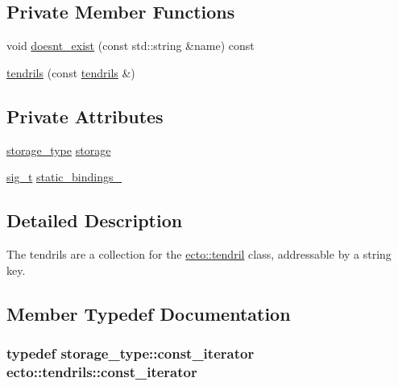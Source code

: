 \subsection*{Private Member Functions}
\begin{DoxyCompactItemize}
\item 
void \hyperlink{classecto_1_1tendrils_aa33d16327157994060a8051d2bbe018e}{doesnt\+\_\+exist} (const std\+::string \&name) const 
\item 
\hyperlink{classecto_1_1tendrils_a7ee52bb996bd2ec581ff2008dea341dc}{tendrils} (const \hyperlink{classecto_1_1tendrils}{tendrils} \&)
\end{DoxyCompactItemize}
\subsection*{Private Attributes}
\begin{DoxyCompactItemize}
\item 
\hyperlink{classecto_1_1tendrils_a3647503829f1b29de220584d265c63fb}{storage\+\_\+type} \hyperlink{classecto_1_1tendrils_afaa587298937ffa94ccfefc8a97b4edc}{storage}
\item 
\hyperlink{classecto_1_1tendrils_aca7990b4d8ccfbddfb4d5c805345ca23}{sig\+\_\+t} \hyperlink{classecto_1_1tendrils_a40635d009ae082dccde9486c1293212e}{static\+\_\+bindings\+\_\+}
\end{DoxyCompactItemize}


\subsection{Detailed Description}
The tendrils are a collection for the \hyperlink{classecto_1_1tendril}{ecto\+::tendril} class, addressable by a string key. 

\subsection{Member Typedef Documentation}
\subsubsection[{\texorpdfstring{const\+\_\+iterator}{const_iterator}}]{\setlength{\rightskip}{0pt plus 5cm}typedef storage\+\_\+type\+::const\+\_\+iterator {\bf ecto\+::tendrils\+::const\+\_\+iterator}}\hypertarget{classecto_1_1tendrils_a86df9983555ca4ebdae8b1d36aa4bbd8}{}\label{classecto_1_1tendrils_a86df9983555ca4ebdae8b1d36aa4bbd8}
